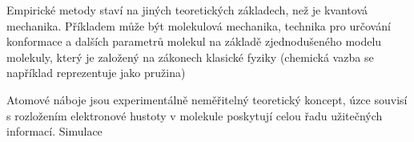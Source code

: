 \documentclass[11pt,draft,oneside]{fithesis2}
\newcommand\todo[1]{\textcolor{red}{[[#1]]}}
\renewcommand\todo[1]{}
\begin{document}
Empirické metody staví na jiných teoretických základech, než je kvantová mechanika. Příkladem může být molekulová mechanika, technika pro určování konformace a dalších parametrů molekul na základě zjednodušeného modelu molekuly, který je založený na zákonech klasické fyziky (chemická vazba se například reprezentuje jako pružina)







\todo{proč počítat parcialní náboje}






\todo{parcialní náboje mají fyzikální smysl}

\todo{experimentalni dukazy spektroskopie}

\todo{polarita molekul}

\todo{vyuziti naboju k fitovani vlastnosti}

\todo{dipolove momenty, ...}


Atomové náboje jsou experimentálně neměřitelný teoretický koncept, úzce souvisí s rozložením elektronové hustoty v molekule poskytují celou řadu užitečných informací. Simulace
\end{document}
